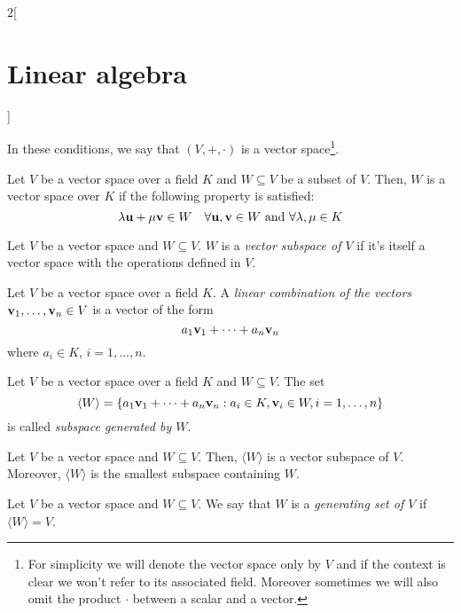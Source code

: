 \documentclass[../../../main.tex]{subfiles}
\begin{document}
\begin{multicols}{2}[\section{Linear algebra}]
\begin{definition}
\begin{enumerate}
    \end{enumerate}
    In these conditions, we say that $(V,+,\cdot)$ is a vector space\footnote{For simplicity we will denote the vector space only by $V$ and if the context is clear we won't refer to its associated field. Moreover sometimes we will also omit the product $\cdot$ between a scalar and a vector.}.
  \end{definition}
  \begin{definition}
    Let $V$ be a vector space over a field $K$ and $W\subseteq V$ be a subset of $V$. Then, $W$ is a vector space over $K$ if the following property is satisfied:
    $$\lambda \vb{u}+\mu \vb{v}\in W\quad\forall \vb{u},\vb{v}\in W\text{ and }\forall\lambda,\mu\in K$$
  \end{definition}
  \begin{definition}
    Let $V$ be a vector space and $W\subseteq V$. $W$ is a \textit{vector subspace of $V$} if it's itself a vector space with the operations defined in $V$.
  \end{definition}
  \begin{definition}
    Let $V$ be a vector space over a field $K$. A \textit{linear combination of the vectors $\vb{v}_1,\ldots,\vb{v}_n\in V$} is a vector of the form $$a_1\vb{v}_1+\cdots+a_n\vb{v}_n$$ where $a_i\in K$, $i=1,\ldots,n$.
  \end{definition}
  \begin{definition}
    Let $V$ be a vector space over a field $K$ and $W\subseteq V$. The set $$\langle W\rangle=\{a_1\vb{v}_1+\cdots+a_n\vb{v}_n:a_i\in K,\vb{v}_i\in W,i=1,\ldots,n\}$$ is called \textit{subspace generated by $W$}.
  \end{definition}
  \begin{lemma}
    Let $V$ be a vector space and $W\subseteq V$. Then, $\langle W\rangle$ is a vector subspace of $V$. Moreover, $\langle W\rangle$ is the smallest subspace containing $W$.
  \end{lemma}
  \begin{definition}
    Let $V$ be a vector space and $W\subseteq V$. We say that $W$ is a \textit{generating set of $V$} if $\langle W\rangle=V$.
  \end{definition}

\end{multicols}
\end{document}
